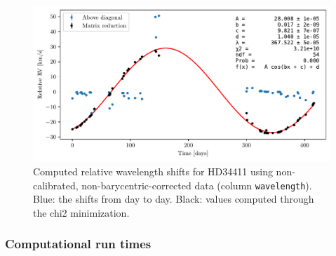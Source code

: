     \begin{figure}%
        \begin{wide}  
            \includegraphics[width=\textwidth]{figures/shift_non_bary_centric.pdf}
            \caption{Computed relative wavelength shifts for HD34411 using non-calibrated, non-barycentric-corrected data (column \texttt{wavelength}). Blue: the shifts from day to day. Black: values computed through the chi2 minimization.}
            \label{fig:RV_results_non_barycentric}
        \end{wide}
    \end{figure}

    \subsubsection{Computational run times}



